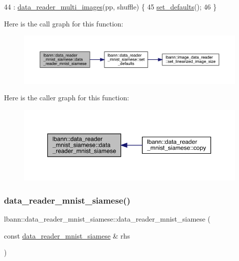 \begin{DoxyCode}
44   : \hyperlink{classlbann_1_1data__reader__multi__images_a91725ae909007b26410837257aa921dc}{data\_reader\_multi\_images}(pp, shuffle) \{
45   \hyperlink{classlbann_1_1data__reader__mnist__siamese_a7e1c9530b5d56a0835db8a30af980164}{set\_defaults}();
46 \}
\end{DoxyCode}
Here is the call graph for this function\+:\nopagebreak
\begin{figure}[H]
\begin{center}
\leavevmode
\includegraphics[width=350pt]{classlbann_1_1data__reader__mnist__siamese_af10a15ece71ae9c20069161a1c83abcd_cgraph}
\end{center}
\end{figure}
Here is the caller graph for this function\+:\nopagebreak
\begin{figure}[H]
\begin{center}
\leavevmode
\includegraphics[width=350pt]{classlbann_1_1data__reader__mnist__siamese_af10a15ece71ae9c20069161a1c83abcd_icgraph}
\end{center}
\end{figure}
\mbox{\label{classlbann_1_1data__reader__mnist__siamese_ac68ac9d831b8ac2209069fb4d407060a}} 
\subsubsection{\texorpdfstring{data\+\_\+reader\+\_\+mnist\+\_\+siamese()}{data\_reader\_mnist\_siamese()}\hspace{0.1cm}{\footnotesize\ttfamily [2/2]}}
{\footnotesize\ttfamily lbann\+::data\+\_\+reader\+\_\+mnist\+\_\+siamese\+::data\+\_\+reader\+\_\+mnist\+\_\+siamese (\begin{DoxyParamCaption}\item[{const \hyperlink{classlbann_1_1data__reader__mnist__siamese}{data\+\_\+reader\+\_\+mnist\+\_\+siamese} \&}]{rhs }\end{DoxyParamCaption})}



